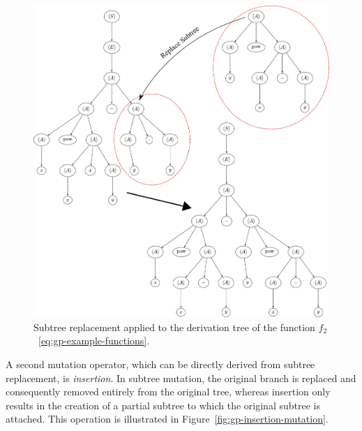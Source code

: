 \begin{figure}[ht]
	\centering
	\includegraphics[scale=0.474]{figures/trees/subtree_mutation.pdf}
	\caption{Subtree replacement applied to the derivation tree of the function $f_2$~\eqref{eq:gp-example-functions}.}
	\label{fig:gp-replacement-mutation}
\end{figure}
A second mutation operator, which can be directly derived from subtree replacement, is \emph{insertion}.
In subtree mutation, the original branch is replaced and consequently removed entirely from the original tree, whereas insertion only results in the creation of a partial subtree to which the original subtree is attached.
This operation is illustrated in Figure~\ref{fig:gp-insertion-mutation}.
